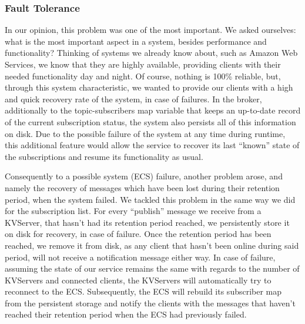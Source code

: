 \documentclass[sigconf]{acmart}
\begin{document}
\subsubsection{Fault Tolerance}
In our opinion, this problem was one of the most important. We asked ourselves: what is the most important aspect in a system, besides performance and functionality? Thinking of systems we already know about, such as Amazon Web Services, we know that they are highly available, providing clients with their needed functionality day and night. Of course, nothing is 100\% reliable, but, through this system characteristic, we wanted to provide our clients with a high and quick recovery rate of the system, in case of failures. In the broker, additionally to the topic-subscribers map variable that keeps an up-to-date record of the current subscription status, the system also persists all of this information on disk. Due to the possible failure of the system at any time during runtime, this additional feature would allow the service to recover its last “known” state of the subscriptions and resume its functionality as usual. 

Consequently to a possible system (ECS) failure, another problem arose, and namely the recovery of messages which have been lost during their retention period, when the system failed. We tackled this problem in the same way we did for the subscription list. For every “publish” message we receive from a KVServer, that hasn’t had its retention period reached, we persistently store it on disk for recovery, in case of failure. Once the retention period has been reached, we remove it from disk, as any client that hasn’t been online during said period, will not receive a notification message either way. In case of failure, assuming the state of our service remains the same with regards to the number of KVServers and connected clients, the KVServers will automatically try to reconnect to the ECS. Subsequently, the ECS will rebuild its subscriber map from the persistent storage and notify the clients with the messages that haven’t reached their retention period when the ECS had previously failed.
\end{document}
